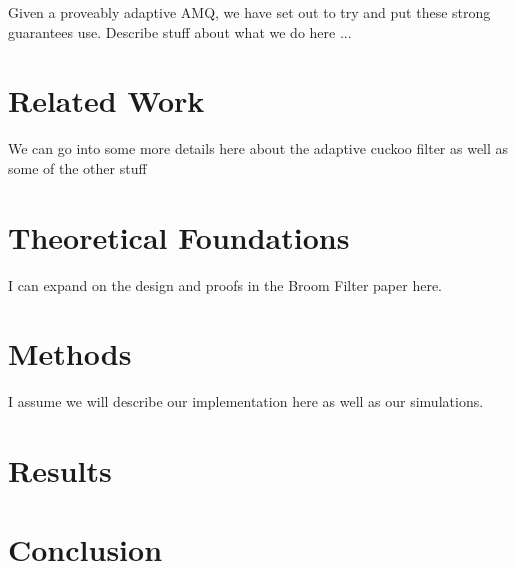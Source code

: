 \documentclass[11pt]{article}
\begin{document}
	Given a proveably adaptive AMQ, we have set out to try and put these strong guarantees use.  Describe stuff about what we do here ...

\section{Related Work}
We can go into some more details here about the adaptive cuckoo filter as well as some of the other stuff
\section{Theoretical Foundations}
I can expand on the design and proofs in the Broom Filter paper here.  
\section{Methods}
I assume we will describe our implementation here as well as our simulations. 
\section{Results}

\section{Conclusion}




\end{document}
